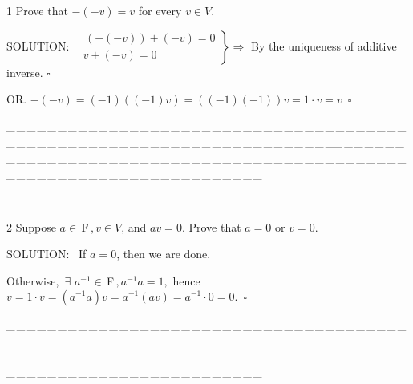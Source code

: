 \documentclass[a4paper, 11pt, UTF8]{article}
\def\Fbf{$\,{\timesbf F}\,$}
\begin{document}
\begin{large}
{\timesbf\Large 1} {\timessl\Large 
Prove that $-(-v) = v$ for every $v\in V$.
}\par
{\timesbf S\footnotesize{OLUTION:}}\,\,\,
$\left.\begin{array}{l}\,(-(-v))+(-v)=0\\ v+(-v)=0\end{array}\right\}\Rightarrow$ By the uniqueness of additive inverse. $\square$\par\quad
O{\small R}. $-(-v)=(-1)((-1)v)=((-1)(-1))v=1\cdot v=v\,\,\,\square$
\par
{\tiny \_\,\_\,\_\,\_\,\_\,\_\,\_\,\_\,\_\,\_\,\_\,\_\,\_\,\_\,\_\,\_\,\_\,\_\,\_\,\_\,\_\,\_\,\_\,\_\,\_\,\_\,\_\,\_\,\_\,\_\,\_\,\_\,\_\,\_\,\_\,\_\,\_\,\_\,\_\,\_\,\_\,\_\,\_\,\_\,\_\,\_\,\_\,\_\,\_\,\_\,\_\,\_\,\_\,\_\,\_\,\_\,\_\,\_\,\_\,\_\,\_\,\_\,\_\,\_\,\_\,\_\,\_\,\_\,\_\,\_\,\_\_\,\_\,\_\,\_\,\_\,\_\,\_\,\_\,\_\,\_\,\_\,\_\,\_\,\_\,\_\,\_\,\_\,\_\,\_\,\_\,\_\,\_\,\_\,\_\,\_\,\_\,\_\,\_\,\_\,\_\,\_\,\_\,\_\,\_\,\_\,\_\,\_\,\_\,\_\,\_\,\_\,\_\,\_\,\_\,\_\,\_\,\_\,\_\,\_\,\_\,\_\,\_\,\_\,\_\,\_\,\_\,\_\,\_\,\_\,\_\,\_\,\_\,\_\,\_\,\_\,\_\,\_\,\_\,\_\,\_\,\_}{\tiny\,\par}

{\timesbf\Large 2} {\timessl\Large 
Suppose $a\in\Fbf,v\in V$, and $av = 0$. Prove that $a = 0$ or $v = 0$.
}\par
{\timesbf S\footnotesize{OLUTION:}}\,\,\,
If $a=0$, then we are done.\par\qquad\qquad\quad
Otherwise, $\,\exists\,\,a^{-1}\in\Fbf,a^{-1}a=1,$ hence $v=1\cdot v=(a^{-1}a)v=a^{-1}(av)=a^{-1}\cdot 0=0.\,\,\,\square$\par
{\tiny \_\,\_\,\_\,\_\,\_\,\_\,\_\,\_\,\_\,\_\,\_\,\_\,\_\,\_\,\_\,\_\,\_\,\_\,\_\,\_\,\_\,\_\,\_\,\_\,\_\,\_\,\_\,\_\,\_\,\_\,\_\,\_\,\_\,\_\,\_\,\_\,\_\,\_\,\_\,\_\,\_\,\_\,\_\,\_\,\_\,\_\,\_\,\_\,\_\,\_\,\_\,\_\,\_\,\_\,\_\,\_\,\_\,\_\,\_\,\_\,\_\,\_\,\_\,\_\,\_\,\_\,\_\,\_\,\_\,\_\,\_\_\,\_\,\_\,\_\,\_\,\_\,\_\,\_\,\_\,\_\,\_\,\_\,\_\,\_\,\_\,\_\,\_\,\_\,\_\,\_\,\_\,\_\,\_\,\_\,\_\,\_\,\_\,\_\,\_\,\_\,\_\,\_\,\_\,\_\,\_\,\_\,\_\,\_\,\_\,\_\,\_\,\_\,\_\,\_\,\_\,\_\,\_\,\_\,\_\,\_\,\_\,\_\,\_\,\_\,\_\,\_\,\_\,\_\,\_\,\_\,\_\,\_\,\_\,\_\,\_\,\_\,\_\,\_\,\_\,\_\,\_}{\tiny\,\par}


\end{large}
\end{document}
